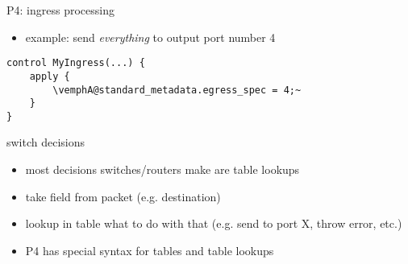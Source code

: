 \usetikzlibrary{arrows.meta,decorations.pathreplacing}


\begin{frame}[fragile]{P4: ingress processing}
\providecommand{\vemphA}[1]{\myemph<2>{#1}}
\providecommand{\vemphB}[1]{\myemph<3>{#1}}
\providecommand{\vemphC}[1]{\myemph<4>{#1}}
\providecommand{\vemphD}[1]{\myemph<5>{#1}}
\begin{itemize}
\item example: send \textit{everything} to output port number 4
\end{itemize}
\begin{Verbatim}[fontsize=\small,commandchars=\\@~]
control MyIngress(...) {
    apply {
        \vemphA@standard_metadata.egress_spec = 4;~
    }
}
\end{Verbatim}
\end{frame}

\begin{frame}{switch decisions}
    \begin{itemize}
    \item most decisions switches/routers make are table lookups
    \vspace{.5cm}
    \item take field from packet (e.g. destination)
    \item lookup in table what to do with that
        (e.g. send to port X, throw error, etc.)
    \vspace{.5cm}
    \item P4 has special syntax for tables and table lookups
    \end{itemize}
\end{frame}


